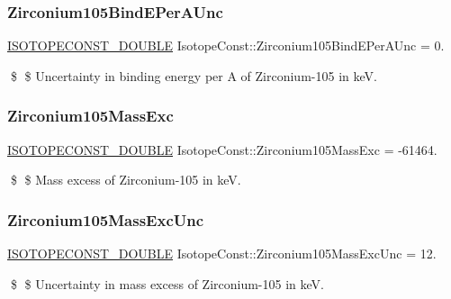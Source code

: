 \subsubsection{\texorpdfstring{Zirconium105\+Bind\+E\+Per\+A\+Unc}{Zirconium105BindEPerAUnc}}
{\footnotesize\ttfamily \mbox{\hyperlink{group___isotope_const-_macros_ga8f45a7272ce02c0b4c65c44636ed719a}{I\+S\+O\+T\+O\+P\+E\+C\+O\+N\+S\+T\+\_\+\+D\+O\+U\+B\+LE}} Isotope\+Const\+::\+Zirconium105\+Bind\+E\+Per\+A\+Unc = 0.}

\$ \$ Uncertainty in binding energy per A of Zirconium-\/105 in keV. \mbox{\label{group___isotope_const-_zirconium-_zr105_ga9b3ff5620022248aee79eb1b7e5ce484}} 
\subsubsection{\texorpdfstring{Zirconium105\+Mass\+Exc}{Zirconium105MassExc}}
{\footnotesize\ttfamily \mbox{\hyperlink{group___isotope_const-_macros_ga8f45a7272ce02c0b4c65c44636ed719a}{I\+S\+O\+T\+O\+P\+E\+C\+O\+N\+S\+T\+\_\+\+D\+O\+U\+B\+LE}} Isotope\+Const\+::\+Zirconium105\+Mass\+Exc = -\/61464.}

\$ \$ Mass excess of Zirconium-\/105 in keV. \mbox{\label{group___isotope_const-_zirconium-_zr105_ga5757a4da0c7ab56874fd57226f113b7b}} 
\subsubsection{\texorpdfstring{Zirconium105\+Mass\+Exc\+Unc}{Zirconium105MassExcUnc}}
{\footnotesize\ttfamily \mbox{\hyperlink{group___isotope_const-_macros_ga8f45a7272ce02c0b4c65c44636ed719a}{I\+S\+O\+T\+O\+P\+E\+C\+O\+N\+S\+T\+\_\+\+D\+O\+U\+B\+LE}} Isotope\+Const\+::\+Zirconium105\+Mass\+Exc\+Unc = 12.}

\$ \$ Uncertainty in mass excess of Zirconium-\/105 in keV. \mbox{\label{group___isotope_const-_zirconium-_zr105_ga78e0d7c3884b4a3a11ff0ab227e0429e}} 
